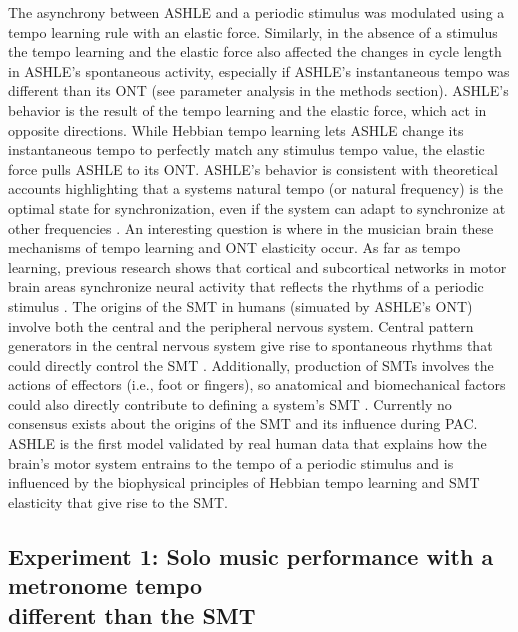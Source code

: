 \documentclass{report}
\begin{document}
The asynchrony between ASHLE and a periodic stimulus was modulated using a tempo learning rule with an elastic force. Similarly, in the absence of a stimulus the tempo learning and the elastic force also affected the changes in cycle length in ASHLE's spontaneous activity, especially if ASHLE's instantaneous tempo was different than its ONT (see parameter analysis in the methods section). ASHLE's behavior is the result of the tempo learning and the elastic force, which act in opposite directions. While Hebbian tempo learning lets ASHLE change its instantaneous tempo to perfectly match any stimulus tempo value, the elastic force pulls ASHLE to its ONT. ASHLE's behavior is consistent with theoretical accounts highlighting that a systems natural tempo (or natural frequency) is the optimal state for synchronization, even if the system can adapt to synchronize at other frequencies \cite{von1937nature, haken1985theoretical, kelso1997relative, scheurich2018tapping}. An interesting question is where in the musician brain these mechanisms of tempo learning and ONT elasticity occur. As far as tempo learning, previous research shows that cortical and subcortical networks in motor brain areas synchronize neural activity that reflects the rhythms of a periodic stimulus \cite{large2015neural, chen2008moving, grahn2009feeling, fujioka2012internalized}. The origins of the SMT in humans (simuated by ASHLE's ONT) involve both the central and the peripheral nervous system. Central pattern generators in the central nervous system give rise to spontaneous rhythms that could directly control the SMT \cite{latash1992virtual}. Additionally, production of SMTs involves the actions of effectors (i.e., foot or fingers), so anatomical and biomechanical factors could also directly contribute to defining a system's SMT \cite{goodman2000advantages}. Currently no consensus exists about the origins of the SMT and its influence during PAC. ASHLE is the first model validated by real human data that explains how the brain's motor system entrains to the tempo of a periodic stimulus and is influenced by the biophysical principles of Hebbian tempo learning and SMT elasticity that give rise to the SMT.

\subsection{Experiment 1: Solo music performance with a metronome tempo \\ different than the SMT}
\end{document}
